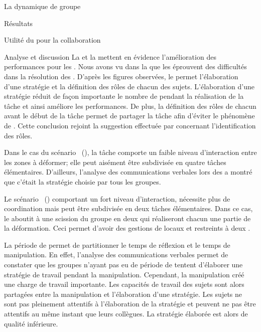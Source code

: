 \documentclass[myfrancais,ngerman,english,french]{mythesis}
\begin{document}
\begin{mychapter}{La dynamique de groupe}
\begin{mysection}{Résultats}
\begin{mysubsection}{Utilité du \mybrainstorming pour la collaboration}
\begin{mysubsubsection}{Analyse et discussion}
					La  et la  mettent en évidence l'amélioration des performances pour les .
					Nous avons vu dans la  que les  éprouvent des difficultés dans la résolution des .
					D'après les figures observées, le \mybrainstorming permet l'élaboration d'une stratégie et la définition des rôles de chacun des sujets.
					L'élaboration d'une stratégie réduit de façon importante le nombre de  pendant la réalisation de la tâche et ainsi améliore les performances.
					De plus, la définition des rôles de chacun avant le début de la tâche permet de partager la tâche afin d'éviter le phénomène de .
					Cette conclusion rejoint la suggestion effectuée par  concernant l'identification des rôles.

					Dans le cas du scénario~ (\myPrion), la tâche comporte un faible niveau d'interaction entre les zones à déformer; elle peut aisément être subdivisée en quatre tâches élémentaires.
					D'ailleurs, l'analyse des communications verbales lors des \mybrainstorming a montré que c'était la stratégie choisie par tous les groupes.

					Le scénario~ (\myUbiquitin) comportant un fort niveau d'interaction, nécessite plus de coordination mais peut être subdivisée en deux tâches élémentaires.
					Dans ce cas, le \mybrainstorming aboutit à une scission du groupe en deux  qui réaliseront chacun une partie de la déformation.
					Ceci permet d'avoir des gestions de  locaux et restreints à deux .

					La période de \mybrainstorming permet de partitionner le temps de réflexion et le temps de manipulation.
					En effet, l'analyse des communications verbales permet de constater que les groupes n'ayant pas eu de période de \mybrainstorming tentent d'élaborer une stratégie de travail pendant la manipulation.
					Cependant, la manipulation créé une charge de travail importante.
					Les capacités de travail des sujets sont alors partagées entre la manipulation et l'élaboration d'une stratégie.
					Les sujets ne sont pas pleinement attentifs à l'élaboration de la stratégie et peuvent ne pas être attentifs au même instant que leurs collègues.
					La stratégie élaborée est alors de qualité inférieure.


\end{mysubsubsection}
\end{mysubsection}
\end{mysection}
\end{mychapter}
\end{document}
